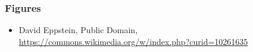 \begin{frame}[fragile]
\frametitle{Figures}

        \begin{itemize}
          \item
David Eppstein, Public Domain, \url{https://commons.wikimedia.org/w/index.php?curid=10261635}
        \end{itemize}
\end{frame}


